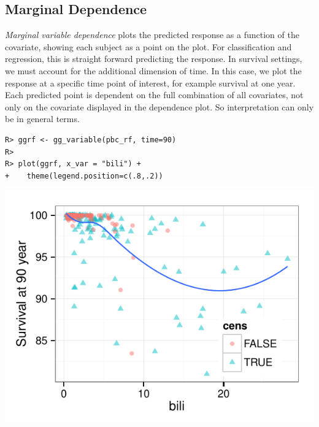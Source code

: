 \documentclass[nojss]{jss}\usepackage[]{graphicx}\usepackage[]{color}
\makeatletter
\def\maxwidth{ %
  \ifdim\Gin@nat@width>\linewidth
    \linewidth
  \else
    \Gin@nat@width
  \fi
}
\newenvironment{kframe}{%
 \def\at@end@of@kframe{}%
 \ifinner\ifhmode%
  \def\at@end@of@kframe{\end{minipage}}%
  \begin{minipage}{\columnwidth}%
 \fi\fi%
 \def\FrameCommand##1{\hskip\@totalleftmargin \hskip-\fboxsep
 \colorbox{shadecolor}{##1}\hskip-\fboxsep
     \hskip-\linewidth \hskip-\@totalleftmargin \hskip\columnwidth}%
 \MakeFramed {\advance\hsize-\width
   \@totalleftmargin\z@ \linewidth\hsize
   \@setminipage}}%
 {\par\unskip\endMakeFramed%
 \at@end@of@kframe}
\newenvironment{knitrout}{}{} %
\makeatother
\begin{document}
\subsection{Marginal Dependence}\label{S:variablePlots}
\emph{Marginal variable dependence} plots the predicted response as a function of the covariate, showing each subject as a point on the plot. For classification and regression, this is straight forward predicting the response. In survival settings, we must account for the additional dimension of time. In this case, we plot the response at a specific time point of interest, for example survival at one year. Each predicted point is dependent on the full combination of all covariates, not only on the covariate displayed in the dependence plot. So interpretation can only be in general terms.  
\begin{knitrout}\footnotesize
{}\color{fgcolor}\begin{kframe}
\begin{verbatim}
R> ggrf <- gg_variable(pbc_rf, time=90)
R> 
R> plot(ggrf, x_var = "bili") +
+    theme(legend.position=c(.8,.2))
\end{verbatim}
\end{kframe}

{\centering \includegraphics[width=\maxwidth]{figure/vig-variable-plot-1} 

}



\end{knitrout}
\end{document}
